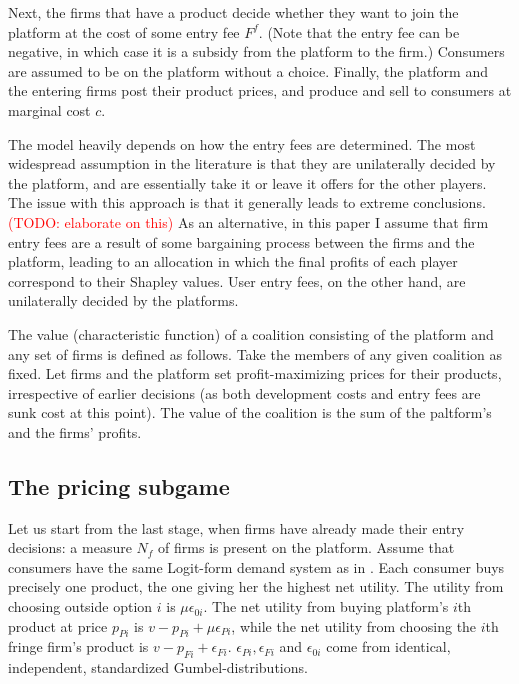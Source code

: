 \documentclass[a4paper]{article}
\begin{document}
Next, the firms that have a product decide whether they want to join the platform at the cost of some entry fee $F^f$. (Note that the entry fee can be negative, in which case it is a subsidy from the platform to the firm.) Consumers are assumed to be on the platform without a choice. Finally, the platform and the entering firms post their product prices, and produce and sell to consumers at marginal cost $c$.

The model heavily depends on how the entry fees are determined. The most widespread assumption in the literature is that they are unilaterally decided by the platform, and are essentially take it or leave it offers for the other players. The issue with this approach is that it generally leads to extreme conclusions. \textcolor{red}{(TODO: elaborate on this)} As an alternative, in this paper I assume that firm entry fees are a result of some bargaining process between the firms and the platform, leading to an allocation in which the final profits of each player correspond to their Shapley values. User entry fees, on the other hand, are unilaterally decided by the platforms.

The value (characteristic function) of a coalition consisting of the platform and any set of firms is defined as follows. Take the members of any given coalition as fixed. Let firms and the platform set profit-maximizing prices for their products, irrespective of earlier decisions (as both development costs and entry fees are sunk cost at this point). The value of the coalition is the sum of the paltform's and the firms' profits.

\subsection{The pricing subgame}

Let us start from the last stage, when firms have already made their entry decisions: a measure $N_f$ of firms is present on the platform. Assume that consumers have the same Logit-form demand system as in \textcite{anderson2021hybrid}. Each consumer buys precisely one product, the one giving her the highest net utility. The utility from choosing outside option $i$ is $\mu \epsilon_{0i}$. The net utility from buying platform's $i$th product at price $p_{Pi}$ is $v - p_{Pi} + \mu \epsilon_{Pi}$, while the net utility from choosing the $i$th fringe firm's product is $v - p_{Fi} + \epsilon_{Fi}$. $\epsilon_{Pi}, \epsilon_{Fi}$ and $\epsilon_{0i}$ come from identical, independent, standardized Gumbel-distributions.
\end{document}

